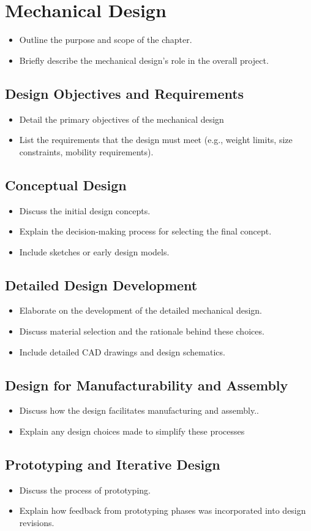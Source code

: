 \chapter{Mechanical Design}

\graphicspath{{./Figures/Modeling}}


\begin{itemize}
	\item Outline the purpose and scope of the chapter.
	\item Briefly describe the mechanical design's role in the overall project.
\end{itemize}


\section{Design Objectives and Requirements}
\begin{itemize}
	\item Detail the primary objectives of the mechanical design
	\item List the requirements that the design must meet (e.g., weight limits, size constraints, mobility requirements).
\end{itemize}
\section{Conceptual Design}
\begin{itemize}
	\item Discuss the initial design concepts.
	\item Explain the decision-making process for selecting the final concept.
	\item Include sketches or early design models.
\end{itemize}
\section{Detailed Design Development}
\begin{itemize}
	\item Elaborate on the development of the detailed mechanical design.
	\item Discuss material selection and the rationale behind these choices.
	\item Include detailed CAD drawings and design schematics.
\end{itemize}
\section{Design for Manufacturability and Assembly}
\begin{itemize}
	\item Discuss how the design facilitates manufacturing and assembly..
	\item Explain any design choices made to simplify these processes 
\end{itemize}
\section{Prototyping and Iterative Design}
\begin{itemize}
	\item Discuss the process of prototyping.
	\item Explain how feedback from prototyping phases was incorporated into design revisions.
\end{itemize}

